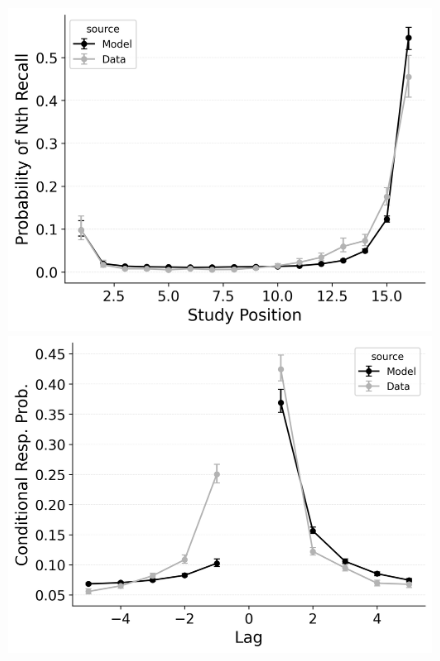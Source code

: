 \documentclass[
  man,
  floatsintext,
  longtable,
  nolmodern,
  notxfonts,
  notimes,
  draftfirst,
  colorlinks=true,linkcolor=blue,citecolor=blue,urlcolor=blue]{apa7}
\begin{document}
\begin{figure}
\begin{minipage}{0.33\linewidth}
\includegraphics{figures/bw_HealeyKahana2014_CRU_with_Pre-Expt__Primacy__and_StartDrift_Fitting_pnr.png}\end{minipage}%
%
\begin{minipage}{0.33\linewidth}
\includegraphics{figures/bw_HealeyKahana2014_CRU_with_Pre-Expt__Primacy__and_StartDrift_Fitting_crp.png}\end{minipage}%
%
\begin{minipage}{0.33\linewidth}

\end{minipage}
\end{figure}
\end{document}
